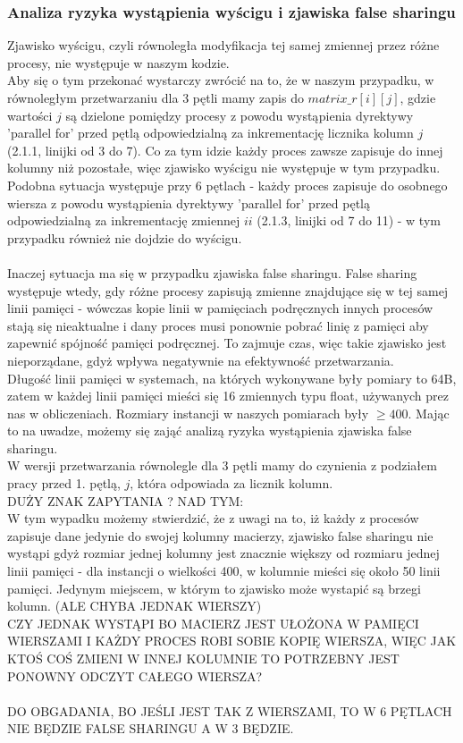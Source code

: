 \documentclass[10pt,a4paper]{article}
\begin{document}
\subsubsection{Analiza ryzyka wystąpienia wyścigu i zjawiska false sharingu}
Zjawisko wyścigu, czyli równoległa modyfikacja tej samej zmiennej przez różne procesy, nie
występuje w naszym kodzie.\\
Aby się o tym przekonać wystarczy zwrócić na to, że w naszym przypadku,
w równoległym przetwarzaniu dla 3 pętli mamy zapis do $matrix\_r[i][j]$, gdzie wartości $j$ są
dzielone pomiędzy procesy z powodu wystąpienia dyrektywy 'parallel for' przed pętlą odpowiedzialną
za inkrementację licznika kolumn $j$ (2.1.1, linijki od 3 do 7). Co za tym idzie każdy proces zawsze zapisuje do innej kolumny
niż pozostałe, więc zjawisko wyścigu nie występuje w tym przypadku.\\
Podobna sytuacja występuje przy 6 pętlach - każdy proces zapisuje do osobnego wiersza z powodu
wystąpienia dyrektywy 'parallel for' przed pętlą odpowiedzialną za inkrementację zmiennej $ii$
(2.1.3, linijki od 7 do 11) - w tym przypadku również nie dojdzie do wyścigu.\\
\\
Inaczej sytuacja ma się w przypadku zjawiska false sharingu. False sharing występuje wtedy, gdy
różne procesy zapisują zmienne znajdujące się w tej samej linii pamięci - wówczas kopie linii
w pamięciach podręcznych innych procesów stają się nieaktualne i dany proces musi ponownie pobrać
linię z pamięci aby zapewnić spójność pamięci podręcznej. To zajmuje czas, więc takie zjawisko
jest nieporządane, gdyż wpływa negatywnie na efektywność przetwarzania.\\
Długość linii pamięci w systemach, na których wykonywane były pomiary to 64B, zatem w każdej
linii pamięci mieści się 16 zmiennych typu float, używanych prez nas w obliczeniach. Rozmiary
instancji w naszych pomiarach były $\geq 400$. Mając to na uwadze, możemy się zająć analizą ryzyka
wystąpienia zjawiska false sharingu.\\
W wersji przetwarzania równolegle dla 3 pętli mamy do czynienia z podziałem pracy przed 1. pętlą, $j$,
która odpowiada za licznik kolumn.\\
DUŻY ZNAK ZAPYTANIA ? NAD TYM:\\
W tym wypadku możemy stwierdzić, że z uwagi na to, iż każdy z procesów zapisuje dane
jedynie do swojej kolumny macierzy, zjawisko false sharingu nie wystąpi gdyż rozmiar jednej kolumny jest
znacznie większy od rozmiaru jednej linii pamięci - dla instancji o wielkości 400, w kolumnie
mieści się około 50 linii pamięci. Jedynym miejscem, w którym to zjawisko może wystapić są brzegi
kolumn. (ALE CHYBA JEDNAK WIERSZY)\\
CZY JEDNAK WYSTĄPI BO MACIERZ JEST UŁOŻONA W PAMIĘCI WIERSZAMI I KAŻDY PROCES ROBI SOBIE KOPIĘ
WIERSZA, WIĘC JAK KTOŚ COŚ ZMIENI W INNEJ KOLUMNIE TO POTRZEBNY JEST PONOWNY ODCZYT CAŁEGO WIERSZA?\\
\\
DO OBGADANIA, BO JEŚLI JEST TAK Z WIERSZAMI, TO W 6 PĘTLACH NIE BĘDZIE FALSE SHARINGU A W 3 BĘDZIE.
\\
\end{document}
